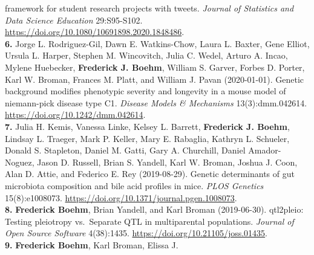 \documentclass[
  10pt,
]
{article}
\begin{document}
framework for student research projects with tweets. \emph{Journal of
Statistics and Data Science Education} 29:S95-S102.
\url{https://doi.org/10.1080/10691898.2020.1848486}.\\
\textbf{6.} \normalsize \normalsize Jorge L. Rodriguez-Gil\normalsize ,
\normalsize Dawn E. Watkins-Chow\normalsize , \normalsize Laura L.
Baxter\normalsize , \normalsize Gene Elliot\normalsize ,
\normalsize Ursula L. Harper\normalsize , \normalsize Stephen M.
Wincovitch\normalsize , \normalsize Julia C. Wedel\normalsize ,
\normalsize Arturo A. Incao\normalsize , \normalsize Mylene
Huebecker\normalsize ,
\textbf{\normalsize Frederick J. Boehm}\normalsize , \normalsize William
S. Garver\normalsize , \normalsize Forbes D. Porter\normalsize ,
\normalsize Karl W. Broman\normalsize , \normalsize Frances M.
Platt\normalsize , and \normalsize William J. Pavan (2020-01-01).
Genetic background modifies phenotypic severity and longevity in a mouse
model of niemann-pick disease type C1. \emph{Disease Models \&
Mechanisms} 13(3):dmm.042614.
\url{https://doi.org/10.1242/dmm.042614}.\\
\textbf{7.} \normalsize \normalsize Julia H. Kemis\normalsize ,
\normalsize Vanessa Linke\normalsize , \normalsize Kelsey L.
Barrett\normalsize ,
\textbf{\normalsize Frederick J. Boehm}\normalsize , \normalsize Lindsay
L. Traeger\normalsize , \normalsize Mark P. Keller\normalsize ,
\normalsize Mary E. Rabaglia\normalsize , \normalsize Kathryn L.
Schueler\normalsize , \normalsize Donald S. Stapleton\normalsize ,
\normalsize Daniel M. Gatti\normalsize , \normalsize Gary A.
Churchill\normalsize , \normalsize Daniel Amador-Noguez\normalsize ,
\normalsize Jason D. Russell\normalsize , \normalsize Brian S.
Yandell\normalsize , \normalsize Karl W. Broman\normalsize ,
\normalsize Joshua J. Coon\normalsize , \normalsize Alan D.
Attie\normalsize , and \normalsize Federico E. Rey (2019-08-29). Genetic
determinants of gut microbiota composition and bile acid profiles in
mice. \emph{PLOS Genetics} 15(8):e1008073.
\url{https://doi.org/10.1371/journal.pgen.1008073}.\\
\textbf{8.}
\normalsize \textbf{\normalsize Frederick Boehm}\normalsize ,
\normalsize Brian Yandell\normalsize , and \normalsize Karl Broman
(2019-06-30). qtl2pleio: Testing pleiotropy vs.~Separate QTL in
multiparental populations. \emph{Journal of Open Source Software}
4(38):1435. \url{https://doi.org/10.21105/joss.01435}.\\
\textbf{9.}
\normalsize \textbf{\normalsize Frederick Boehm}\normalsize ,
\normalsize Karl Broman\normalsize , \normalsize Elissa J.
\end{document}
